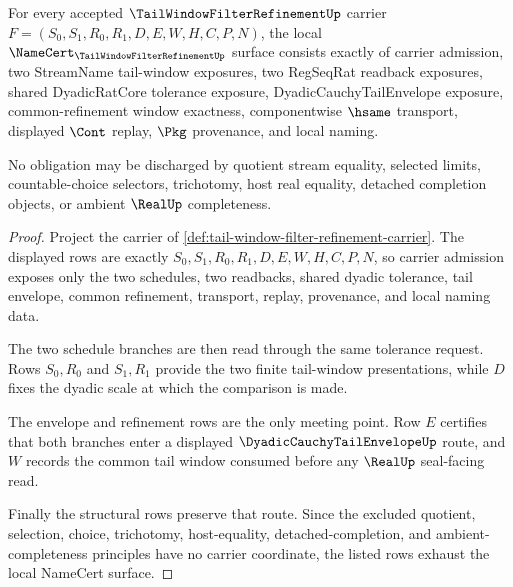 \begin{theorem}
\label{thm:tail-window-filter-refinement-namecert-obligations}
For every accepted $\TailWindowFilterRefinementUp$ carrier $F=(S_0,S_1,R_0,R_1,D,E,W,H,C,P,N)$, the local $\NameCert_{\TailWindowFilterRefinementUp}$ surface consists exactly of carrier admission, two StreamName tail-window exposures, two RegSeqRat readback exposures, shared DyadicRatCore tolerance exposure, DyadicCauchyTailEnvelope exposure, common-refinement window exactness, componentwise $\hsame$ transport, displayed $\Cont$ replay, $\Pkg$ provenance, and local naming.

No obligation may be discharged by quotient stream equality, selected limits, countable-choice selectors, trichotomy, host real equality, detached completion objects, or ambient $\RealUp$ completeness.
\end{theorem}
\begin{proof}
Project the carrier of \autoref{def:tail-window-filter-refinement-carrier}. The displayed rows are exactly $S_0,S_1,R_0,R_1,D,E,W,H,C,P,N$, so carrier admission exposes only the two schedules, two readbacks, shared dyadic tolerance, tail envelope, common refinement, transport, replay, provenance, and local naming data.

The two schedule branches are then read through the same tolerance request. Rows $S_0,R_0$ and $S_1,R_1$ provide the two finite tail-window presentations, while $D$ fixes the dyadic scale at which the comparison is made.

The envelope and refinement rows are the only meeting point. Row $E$ certifies that both branches enter a displayed $\DyadicCauchyTailEnvelopeUp$ route, and $W$ records the common tail window consumed before any $\RealUp$ seal-facing read.

Finally the structural rows preserve that route. Since the excluded quotient, selection, choice, trichotomy, host-equality, detached-completion, and ambient-completeness principles have no carrier coordinate, the listed rows exhaust the local NameCert surface.
\end{proof}

